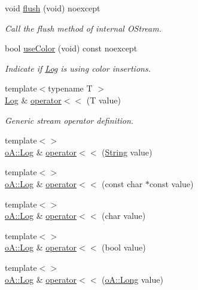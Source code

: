 \begin{DoxyCompactItemize}
void \mbox{\hyperlink{classo_a_1_1_log_ae0c062e6cd347b0e74f74c958a05b20d}{flush}} (void) noexcept
\begin{DoxyCompactList}\small\item\em Call the flush method of internal O\+Stream. \end{DoxyCompactList}\item 
bool \mbox{\hyperlink{classo_a_1_1_log_a212bf1558c244679cf0e361fc1cf1e9a}{use\+Color}} (void) const noexcept
\begin{DoxyCompactList}\small\item\em Indicate if \mbox{\hyperlink{classo_a_1_1_log}{Log}} is using color insertions. \end{DoxyCompactList}\item 
{\footnotesize template$<$typename T $>$ }\\\mbox{\hyperlink{classo_a_1_1_log}{Log}} \& \mbox{\hyperlink{classo_a_1_1_log_a6ce6d2f750bf3baeda1c2541617e4952}{operator$<$$<$}} (T value)
\begin{DoxyCompactList}\small\item\em Generic stream operator definition. \end{DoxyCompactList}\item 
{\footnotesize template$<$$>$ }\\\mbox{\hyperlink{classo_a_1_1_log}{o\+A\+::\+Log}} \& \mbox{\hyperlink{classo_a_1_1_log_acfa81696d9db53900bb4d03f278024ee}{operator$<$$<$}} (\mbox{\hyperlink{classo_a_1_1_string}{String}} value)
\item 
{\footnotesize template$<$$>$ }\\\mbox{\hyperlink{classo_a_1_1_log}{o\+A\+::\+Log}} \& \mbox{\hyperlink{classo_a_1_1_log_ae274c2ff1bc29ba718265e46fcc6207c}{operator$<$$<$}} (const char $\ast$const value)
\item 
{\footnotesize template$<$$>$ }\\\mbox{\hyperlink{classo_a_1_1_log}{o\+A\+::\+Log}} \& \mbox{\hyperlink{classo_a_1_1_log_a54dba53cce06861c82dc760d9c809633}{operator$<$$<$}} (char value)
\item 
{\footnotesize template$<$$>$ }\\\mbox{\hyperlink{classo_a_1_1_log}{o\+A\+::\+Log}} \& \mbox{\hyperlink{classo_a_1_1_log_a151d996709b215055998475e5610ea2c}{operator$<$$<$}} (bool value)
\item 
{\footnotesize template$<$$>$ }\\\mbox{\hyperlink{classo_a_1_1_log}{o\+A\+::\+Log}} \& \mbox{\hyperlink{classo_a_1_1_log_a206fea477101843b2eb9cbc71ebd34cd}{operator$<$$<$}} (\mbox{\hyperlink{namespaceo_a_ab34d92c907da3ac86211277a1341c6c2}{o\+A\+::\+Long}} value)

\end{DoxyCompactItemize}

